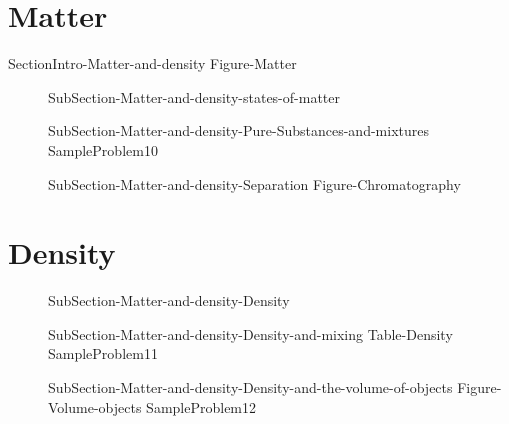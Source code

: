 \documentclass[main.tex]{subfiles}
\newcommand\chapterlabel{Ch-measurements}\setcounter{figurenewcounter}{0}\setcounter{tablenewcounter}{0}\setcounter{formulanewcounter}{0}
\begin{document}
\section{Matter}
{SectionIntro-Matter-and-density}
{Figure-Matter}		
\sloppy\begin{description}
\item[] {SubSection-Matter-and-density-states-of-matter}
\item[]{SubSection-Matter-and-density-Pure-Substances-and-mixtures}
{SampleProblem10}
\item[]{SubSection-Matter-and-density-Separation}
{Figure-Chromatography}		

\end{description}

\section{Density}
\sloppy\begin{description}

\item[]{SubSection-Matter-and-density-Density}
\item[]{SubSection-Matter-and-density-Density-and-mixing}
{Table-Density} 
{SampleProblem11}
\item[]{SubSection-Matter-and-density-Density-and-the-volume-of-objects}
{Figure-Volume-objects}
{SampleProblem12}
\end{description}
\clearpage\thispagestyle{empty}\mbox{}\clearpage
\end{document}

